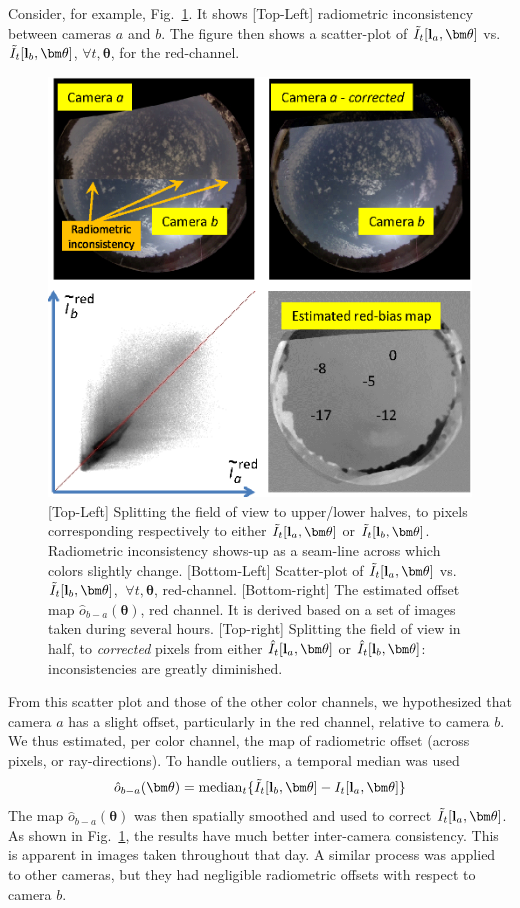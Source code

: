 \documentclass[runningheads]{llncs}
\begin{document}
Consider, for example, Fig.~\ref{fig:calibration}. It shows [Top-Left] radiometric inconsistency between cameras $a$ and $b$. The figure then shows a scatter-plot of
$\tilde I_t[{\bf l}_a,{\bm \theta}]$ vs.~$\tilde I_t[{\bf l}_{b},{\bm \theta}]$, $\forall t,{\bm \theta}$, for the red-channel.
\begin{figure}[t!]
\begin{center}
   \includegraphics[width=0.5\linewidth]{figures/bias1a.eps}
\end{center}
   \vspace{-0.6cm}
   \caption{[Top-Left] Splitting the field of view to upper/lower halves, to pixels corresponding
   respectively to either $\tilde I_t[{\bf l}_a,{\bm \theta}]$  or $\tilde I_t[{\bf l}_{b},{\bm \theta}]$. Radiometric inconsistency
   shows-up as a seam-line across which colors slightly change. [Bottom-Left] Scatter-plot of
   $\tilde I_t[{\bf l}_a,{\bm \theta}]$ vs.~$\tilde I_t[{\bf l}_{b},{\bm \theta}]$, $~\forall t,{\bm \theta}$, red-channel. [Bottom-right] The estimated offset map ${\hat o}_{b-a}({\bm \theta})$, red channel. It is derived based on a set of images taken during several hours.
   [Top-right] Splitting the field of view in half, to {\em corrected} pixels from either
   $\hat I_t[{\bf l}_a,{\bm \theta}]$  or $\hat I_t[{\bf l}_{b},{\bm \theta}]$: inconsistencies are greatly
   diminished.
   }
\label{fig:calibration}
\end{figure}
From this scatter plot and those of the other color channels, we hypothesized that camera $a$ has a slight offset, particularly in the red channel, relative to camera $b$. We thus estimated, per color channel, the map of radiometric offset (across pixels, or ray-directions).
To handle outliers, a temporal median was used
\begin{equation}
 {\hat o}_{b-a}({\bm \theta})=
  {\rm median}_{t} \{\tilde I_t[{\bf l}_b,{\bm \theta}]-I_t[{\bf l}_a,{\bm \theta}]\}
 \label{eq:hato}
\end{equation}
The map ${\hat o}_{b-a}({\bm \theta})$ was then spatially smoothed and used to correct $\tilde I_t[{\bf l}_a,{\bm \theta}]$. As shown in Fig.~\ref{fig:calibration}, the results have much better inter-camera consistency. This is apparent in images taken throughout that day. A similar process was applied to other cameras, but they had negligible radiometric offsets with respect to camera $b$.
\end{document}
